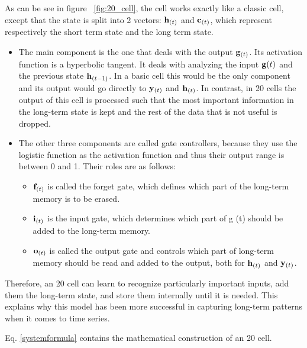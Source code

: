 As can be see in figure ~\ref{fig:20_cell}, the cell works exactly like a classic cell, except that the state is split into 2 vectors: ${\bf h}_{(t)}$ and ${\bf c}_{(t)}$, which represent respectively the short term state and the long term state.
\begin{itemize}
    \item The main component is the one that deals with the output ${\bf g}_{(t)}$. Its activation function is a hyperbolic tangent. It deals with analyzing the input ${\bf g} {(t)}$ and the previous state ${\bf h}_{(t-1)}$. In a basic cell this would be the only component and its output would go directly to ${\bf y }_{(t)}$ and ${\bf h} _{(t)}$. In contrast, in 20 cells the output of this cell is processed such that the most important information in the long-term state is kept and the rest of the data that is not useful is dropped. 
    \item
        The other three components are called gate controllers, because they use the logistic function as the activation function and thus their output range is between 0 and 1. Their roles are as follows: 
        \begin{itemize}
            \item ${\bf f}_{(t)}$ is called the forget gate, which defines which part of the long-term memory is to be erased. 
            \item ${\bf i}_{(t)}$ is the input gate, which determines which part of g (t) should be added to the long-term memory.
            \item ${\bf o}_{(t)}$ is called the output gate and controls which part of long-term memory should be read and added to the output, both for ${\bf h}_{(t)}$ and ${\bf y}_{(t)}$.
        \end{itemize}
\end{itemize}


Therefore, an 20 cell can learn to recognize particularly important inputs, add them the long-term state, and store them internally until it is needed. This explains why this model has been more successful in capturing long-term patterns when it comes to time series.

 Eq. \eqref{systemformula} contains the mathematical construction of an 20 cell.

